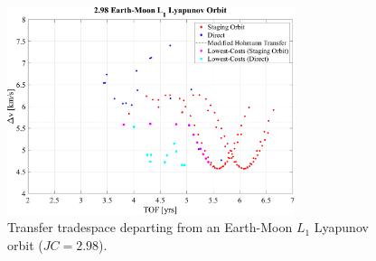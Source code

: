 \begin{figure}[H]
    \centering
    \includegraphics[width=0.75\textwidth]{figures/TradeSpace_L1Lyapunov_2_98.pdf}
    \caption{Transfer tradespace departing from an Earth-Moon $L_{1}$ Lyapunov orbit ($JC=2.98$).}
    \label{fig:fewDirect}
\end{figure}
